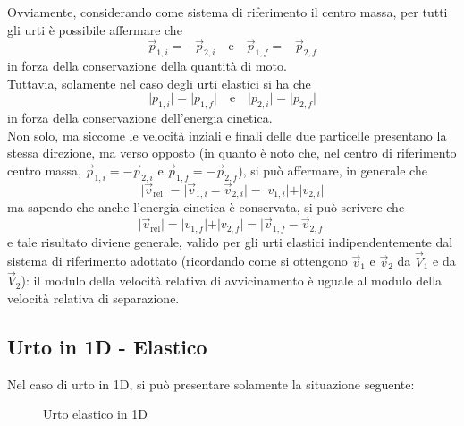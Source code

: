 \documentclass[a4paper]{extarticle}
\begin{document}
\noindent
Ovviamente, considerando come sistema di riferimento il centro massa, per tutti gli urti è possibile affermare che
\[\vec p_{1,i} = - \vec p_{2,i} \hspace{1em} \text{e} \hspace{1em} \vec p_{1,f} = - \vec p_{2,f}\]
in forza della conservazione della quantità di moto.\\
Tuttavia, solamente nel caso degli urti elastici si ha che
\[\vert p_{1,i} \vert = \vert p_{1,f} \vert \hspace{1em} \text{e} \hspace{1em} \vert p_{2,i} \vert = \vert p_{2,f} \vert\]
in forza della conservazione dell'energia cinetica.\\
Non solo, ma siccome le velocità inziali e finali delle due particelle presentano la stessa direzione, ma verso opposto (in quanto è noto che, nel centro di riferimento centro massa, $\vec p_{1,i} = - \vec p_{2,i}$ e $\vec p_{1,f} = - \vec p_{2,f}$), si può affermare, in generale che
\[\vert \vec v_{\text{rel}} \vert = \vert \vec v_{1,i} - \vec v_{2,i} \vert = \vert v_{1,i} \vert + \vert v_{2,i} \vert\]
ma sapendo che anche l'energia cinetica è conservata, si può scrivere che
\[\vert \vec v_{\text{rel}} \vert =  \vert v_{1,f} \vert + \vert v_{2,f} \vert = \vert \vec v_{1,f} - \vec v_{2,f} \vert\]
e tale risultato diviene generale, valido per gli urti elastici indipendentemente dal sistema di riferimento adottato (ricordando come si ottengono $\vec v_1$ e $\vec v_2$ da $\vec V_1$ e da $\vec V_2$): il modulo della velocità relativa di avvicinamento è uguale al modulo della velocità relativa di separazione.

\vspace{1em}
\subsection{Urto in 1D - Elastico}
Nel caso di urto in 1D, si può presentare solamente la situazione seguente:

\begin{figure}[H]
  \centering
  \hspace{3em}
  \caption{Urto elastico in 1D}
  \label{fig:urto_elastico_1D}
\end{figure}
\end{document}
